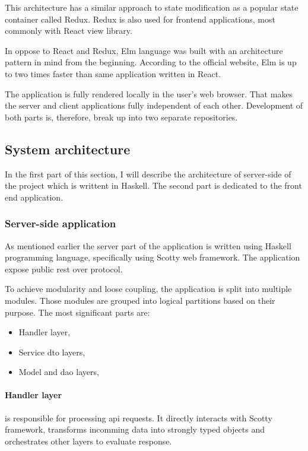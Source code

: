This architecture has a similar approach to state modification as a popular state container called Redux.
Redux is also used for frontend applications, most commonly with React view library.

In oppose to React and Redux, Elm language was built with an architecture pattern in mind from the beginning.
According to the official website\cite{elm-speed}, Elm is up to two times faster than same application written in React.

The application is fully rendered locally in the user's web browser.
That makes the server and client applications fully independent of each other.
Development of both parts is, therefore, break up into two separate repositories.

\subsection{System architecture}

In the first part of this section, I will describe the architecture of server-side of the project which is writtent in Haskell.
The second part is dedicated to the front end application.

\subsubsection*{Server-side application}

As mentioned earlier the server part of the application is written using Haskell programming language, specifically using Scotty web framework.
The application expose public \gls{rest}  over  protocol.

To achieve modularity and loose coupling, the application is split into multiple modules.
Those modules are grouped into logical partitions based on their purpose.
The most significant parts are:

\begin{itemize}
    \item Handler layer,
    \item Service \gls{dto} layers,
    \item Model and \gls{dao} layers,
\end{itemize}

\paragraph*{Handler layer}\label{sec:handler} is responsible for processing \gls{api} requests.
It directly interacts with Scotty framework, transforms incomming data into strongly typed objects and orchestrates other layers to evaluate response.

